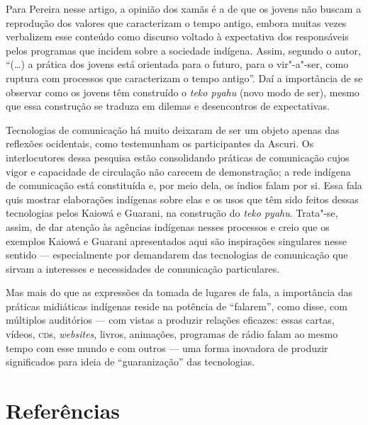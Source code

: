 Para Pereira nesse artigo, a opinião dos xamãs é a de que os jovens não
buscam a reprodução dos valores que caracterizam o tempo antigo, embora
muitas vezes verbalizem esse conteúdo como discurso voltado à
expectativa dos responsáveis pelos programas que incidem sobre a
sociedade indígena. Assim, segundo o autor, ``(\ldots{}) a prática dos jovens
está orientada para o futuro, para o vir"-a"-ser, como ruptura com
processos que caracterizam o tempo antigo''. Daí a importância de se
observar como os jovens têm construído o \emph{teko pyahu} (novo modo de ser),
mesmo que essa construção se traduza em dilemas e desencontros de
expectativas.

Tecnologias de comunicação há muito deixaram de ser um objeto apenas das
reflexões ocidentais, como testemunham os participantes da Ascuri. Os
interlocutores dessa pesquisa estão consolidando práticas de
comunicação cujos vigor e capacidade de circulação não carecem de
demonstração; a rede indígena de comunicação está constituída e, por
meio dela, os índios falam por si. Essa fala quis mostrar elaborações
indígenas sobre elas e os usos que têm sido feitos dessas tecnologias
pelos Kaiowá e Guarani, na construção do \emph{teko pyahu}. Trata"-se, assim,
de dar atenção às agências indígenas nesses processos e creio que os
exemplos Kaiowá e Guarani apresentados aqui são inspirações singulares
nesse sentido --- especialmente por demandarem das tecnologias de
comunicação que sirvam a interesses e necessidades de comunicação
particulares. 

Mas mais do que as expressões da tomada de lugares de fala, a
importância das práticas midiáticas indígenas reside na potência de
``falarem'', como disse, com múltiplos auditórios --- com vistas a produzir
relações eficazes: essas cartas, vídeos, \textsc{cd}s, \emph{websites}, livros,
animações, programas de rádio falam ao mesmo tempo com esse mundo e com
outros --- uma forma inovadora de produzir significados para ideia de
``guaranização'' das tecnologias.

\section{Referências}\ \  \ \ 

